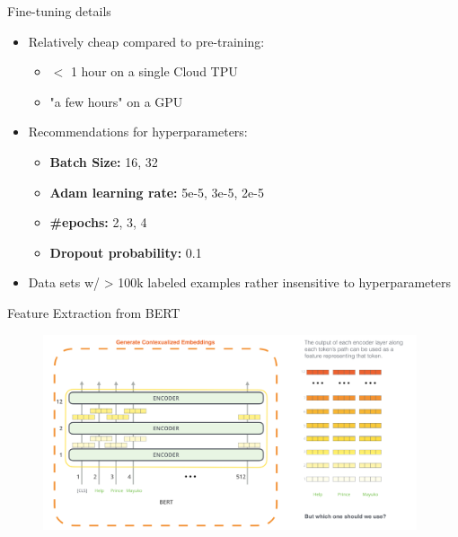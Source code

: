 
\begin{frame}{Fine-tuning details}

\vfill

\begin{itemize}
	\item Relatively cheap compared to pre-training:
		\begin{itemize}
			\item $<$ 1 hour on a single Cloud TPU
			\item "a few hours" on a GPU
		\end{itemize}
	\item Recommendations for hyperparameters:
		\begin{itemize}
			\item \textbf{Batch Size:} 16, 32
			\item \textbf{Adam learning rate:} 5e-5, 3e-5, 2e-5
			\item \textbf{\#epochs:} 2, 3, 4
			\item \textbf{Dropout probability:} 0.1
		\end{itemize}
	\item Data sets w/ > 100k labeled examples rather insensitive to hyperparameters
\end{itemize}
	
\vfill

\end{frame}


\begin{frame}{Feature Extraction from BERT}

\vfill

	\begin{figure}
		\centering
		\includegraphics[width = 11cm]{figure/bert-featextr.png}\\ 
	\end{figure}

\vfill

\end{frame}

